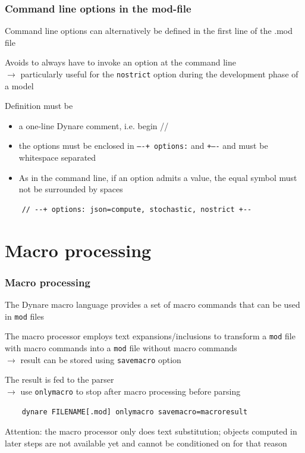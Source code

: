 \documentclass[handout,usepdftitle=false,xcolor=dvipsnames,aspectratio=169]{beamer}
\begin{document}
\begin{frame}[fragile]
  \frametitle{Command line options in the mod-file}
  \begin{witemize}
  \item Command line options can alternatively be defined in the first line of the .mod file
  \item Avoids to always have to invoke an option at the command line\\
  $\rightarrow$ particularly useful for the \texttt{nostrict} option during the development phase of a model
  \item Definition must be
  \begin{itemize}
    \item a one-line Dynare comment, i.e. begin //
    \item the options must be enclosed in \texttt{----+ options:} and \texttt{+----} and must be whitespace separated
    \item As in the command line, if an option admits a value, the equal symbol must not be surrounded by spaces
  \end{itemize}
    \begin{verbatim}
    // --+ options: json=compute, stochastic, nostrict +--
    \end{verbatim}
  \end{witemize}
\end{frame}

\section{Macro processing}

\begin{frame}[fragile]
  \frametitle{Macro processing}
  \begin{witemize}
  \item The Dynare macro language provides a set of macro commands that can be used in \texttt{mod} files
  \item The macro processor employs text expansions/inclusions to transform a \texttt{mod} file with macro commands into a \texttt{mod} file without macro commands\\
  $\rightarrow$ result can be stored using \texttt{savemacro} option
  \item The result is fed to the parser\\
  $\rightarrow$ use \texttt{onlymacro} to stop after macro processing before parsing

    \begin{verbatim}
    dynare FILENAME[.mod] onlymacro savemacro=macroresult
    \end{verbatim}


  \item Attention: the macro processor only does text substitution; objects computed in later steps are not available yet and cannot be conditioned on for that reason
  \end{witemize}
\end{frame}
\end{document}
